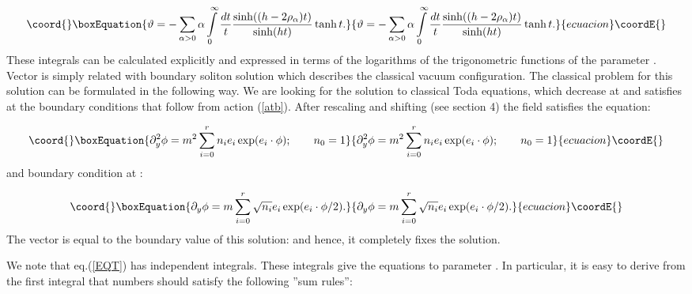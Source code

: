 \documentclass[a4paper,12pt]{article}
\begin{document}
\begin{equation}\coord{}\boxEquation{
\vartheta =-\sum\limits_{\alpha >0}\alpha \int\limits_0^\infty \frac{dt}t
\frac{\sinh ((h-2\rho
_\alpha )t)}{\sinh (ht)}\tanh t.  \label{TT}
}{
\vartheta =-\sum\limits_{\alpha >0}\alpha \int\limits_0^\infty \frac{dt}t
\frac{\sinh ((h-2\rho
_\alpha )t)}{\sinh (ht)}\tanh t.  }{ecuacion}\coordE{}\end{equation}
These integrals can be calculated explicitly and expressed in terms of the
logarithms of the trigonometric functions of the parameter \coordHE{}. 
Vector \myHighlight{$\vartheta $}\coordHE{} is simply related with boundary soliton solution which
describes the classical vacuum configuration. The classical problem for this
solution \coordHE{} can be formulated in the following way. We are
looking for the solution to classical Toda equations, which decrease at \coordHE{} and satisfies at \coordHE{} the boundary conditions that
follow from action (\ref{atb}). After rescaling and shifting (see section 4)
the field \coordHE{}  \coordHE{} satisfies the equation:

\begin{equation}\coord{}\boxEquation{
\partial _y^2\phi =m^2\sum_{i=0}^rn_ie_i\exp (e_i\cdot \phi );\qquad n_0=1
\label{EQT}
}{
\partial _y^2\phi =m^2\sum_{i=0}^rn_ie_i\exp (e_i\cdot \phi );\qquad n_0=1
}{ecuacion}\coordE{}\end{equation}
and boundary condition at \coordHE{}:

\begin{equation}\coord{}\boxEquation{
\partial _y\phi =m\sum\limits_{i=0}^r\sqrt{n_i}e_i\exp (e_i\cdot \phi /2).
\label{YN}
}{
\partial _y\phi =m\sum\limits_{i=0}^r\sqrt{n_i}e_i\exp (e_i\cdot \phi /2).
}{ecuacion}\coordE{}\end{equation}
The vector \myHighlight{$\vartheta $}\coordHE{} is equal to the boundary value of this solution: 
\coordHE{} and hence, it completely fixes the solution.

We note that eq.(\ref{EQT}) has \coordHE{} independent integrals. 
These integrals give the
equations to parameter \myHighlight{$\vartheta $}\coordHE{}. In particular, it is easy to derive from
the first integral that numbers \coordHE{} 
should satisfy the following ''sum rules'':
\end{document}
